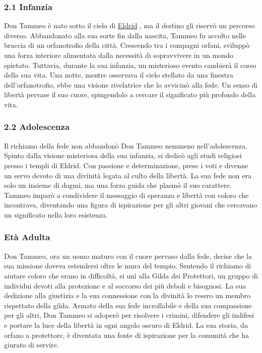 \subsubsection{\texorpdfstring{2.1
\textbf{Infanzia}}{Infanzia}}\label{infanzia}


Don Tammeo è nato sotto il cielo di
\href{Eldrid\%20bd820bb9f6164b39ae6e611a94748518.md}{Eldrid} , ma il
destino gli riservò un percorso diverso. Abbandonato alla sua sorte fin
dalla nascita, Tammeo fu accolto nelle braccia di un orfanotrofio della
città. Crescendo tra i compagni orfani, sviluppò una forza interiore
alimentata dalla necessità di sopravvivere in un mondo spietato.
Tuttavia, durante la sua infanzia, un misterioso evento cambierà il
corso della sua vita. Una notte, mentre osservava il cielo stellato da
una finestra dell'orfanotrofio, ebbe una visione rivelatrice che lo
avvicinò alla fede. Un senso di libertà pervase il suo cuore,
spingendolo a cercare il significato più profondo della vita.

\subsubsection{\texorpdfstring{2.2
\textbf{Adolescenza}}{Adolescenza}}\label{adolescenza}


Il richiamo della fede non abbandonò Don Tammeo nemmeno
nell'adolescenza. Spinto dalla visione misteriosa della sua infanzia, si
dedicò agli studi religiosi presso i templi di Eldrid. Con passione e
determinazione, prese i voti e divenne un servo devoto di una divinità
legata al culto della libertà. La sua fede non era solo un insieme di
dogmi, ma una forza guida che plasmò il suo carattere. Tammeo imparò a
condividere il messaggio di speranza e libertà con coloro che
incontrava, diventando una figura di ispirazione per gli altri giovani
che cercavano un significato nella loro esistenza.

\subsubsection{\texorpdfstring{\textbf{Età
Adulta}}{Età Adulta}}\label{etuxe0-adulta}


Don Tammeo, ora un uomo maturo con il cuore pervaso dalla fede, decise
che la sua missione doveva estendersi oltre le mura del tempio. Sentendo
il richiamo di aiutare coloro che erano in difficoltà, si unì alla Gilda
dei Protettori, un gruppo di individui devoti alla protezione e al
soccorso dei più deboli e bisognosi. La sua dedizione alla giustizia e
la sua connessione con la divinità lo resero un membro rispettato della
gilda. Armato della sua fede incrollabile e della sua compassione per
gli altri, Don Tammeo si adoperò per risolvere i crimini, difendere gli
indifesi e portare la luce della libertà in ogni angolo oscuro di
Eldrid. La sua storia, da orfano a protettore, è diventata una fonte di
ispirazione per la comunità che ha giurato di servire.

